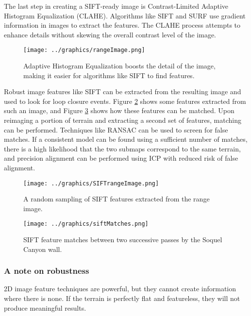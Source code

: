 The last step in creating a SIFT-ready image is Contrast-Limited Adaptive Histogram Equalization (CLAHE). Algorithms like SIFT and SURF use gradient information in images to extract the features. The CLAHE process attempts to enhance details without skewing the overall contrast level of the image. \cite{clahe?}

\begin{figure}[htbp]
   \centering
   \texttt{[image: ../graphics/rangeImage.png]} %
   \caption{Adaptive Histogram Equalization boosts the detail of the image, making it easier for algorithms like SIFT to find features.}
   \label{fig:rangeImageHC}
\end{figure}

Robust image features like SIFT can be extracted from the resulting image and used to look for loop closure events. Figure \ref{fig:SIFTrangeImage} shows some features extracted from such an image, and Figure \ref{fig:matches} shows how these features can be matched. Upon reimaging a portion of terrain and extracting a second set of features, matching can be performed. Techniques like RANSAC can be used to screen for false matches. If a consistent model can be found using a sufficient number of matches, there is a high likelihood that the two submaps correspond to the same terrain, and precision alignment can be performed using ICP with reduced risk of false alignment. 

\begin{figure}[htbp]
   \centering
   \texttt{[image: ../graphics/SIFTrangeImage.png]} %
   \caption{A random sampling of SIFT features extracted from the range image.}
   \label{fig:SIFTrangeImage}
\end{figure}

\begin{figure}[htbp]
   \centering
   \texttt{[image: ../graphics/siftMatches.png]} %
   \caption{SIFT feature matches between two successive passes by the Soquel Canyon wall. }
   \label{fig:matches}
\end{figure}

\subsubsection{A note on robustness}

2D image feature techniques are powerful, but they cannot create information where there is none. If the terrain is perfectly flat and featureless, they will not produce meaningful results. 

